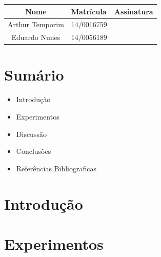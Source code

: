 \documentclass[12pts]{article}
\date{Outubro 09, 2016}
\begin{document}
\maketitle	
\begin{center}

\begin{tabular}{|c|l|r|}
\hline
Nome & Matrícula & Assinatura\\
\hline

Arthur Temporim & 14/0016759 & \\
\hline	
Eduardo Nunes & 14/0056189 & \\

\hline	
\end{tabular}

\end{center}


\newpage

\section{Sumário}

\begin{itemize}
	\item Introdução
	\singlespacing
	\item Experimentos
	\singlespacing
	\item Discussão
	\singlespacing
	\item Conclusões 
	\singlespacing
	\item Referências Bibliograficas
	\singlespacing
\end{itemize}

\newpage


\section{Introdução}

\section{Experimentos}

\end{document}
